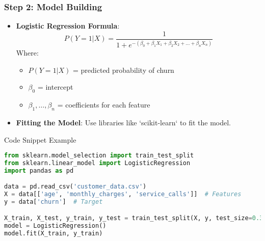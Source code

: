 \documentclass[aspectratio=169]{beamer}
\begin{document}
\begin{frame}[fragile]
    \frametitle{Step 2: Model Building}
    \begin{itemize}
        \item \textbf{Logistic Regression Formula}:
        \begin{equation}
            P(Y=1|X) = \frac{1}{1 + e^{-(\beta_0 + \beta_1X_1 + \beta_2X_2 + ... + \beta_nX_n)}}
        \end{equation}
        Where:
        \begin{itemize}
            \item \( P(Y=1|X) \) = predicted probability of churn
            \item \( \beta_0 \) = intercept
            \item \( \beta_1, \ldots, \beta_n \) = coefficients for each feature
        \end{itemize}
        \item \textbf{Fitting the Model}:
        Use libraries like `scikit-learn` to fit the model.
    \end{itemize}

    \begin{block}{Code Snippet Example}
    \begin{lstlisting}[language=Python]
from sklearn.model_selection import train_test_split
from sklearn.linear_model import LogisticRegression
import pandas as pd

data = pd.read_csv('customer_data.csv')
X = data[['age', 'monthly_charges', 'service_calls']]  # Features
y = data['churn']  # Target

X_train, X_test, y_train, y_test = train_test_split(X, y, test_size=0.3, random_state=42)
model = LogisticRegression()
model.fit(X_train, y_train)
    \end{lstlisting}
    \end{block}
\end{frame}
\end{document}
